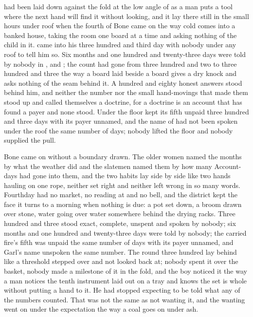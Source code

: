 
 had been laid down against the fold at the low angle of  as a man puts a tool where the next hand will find it without looking, and it lay there still in the small hours under  roof when the fourth of Bone came on the way cold comes into a banked house, taking the room one board at a time and asking nothing of the child in it.  came into his three hundred and third day with nobody under any roof to tell him so. Six months and one hundred and twenty-three days were told by nobody in ,  and ; the count had gone from three hundred and two to three hundred and three the way a board laid beside a board gives a dry knock and asks nothing of the seam behind it. A hundred and eighty honest answers stood behind him, and neither the number nor the small hand-movings that made them stood up and called themselves a doctrine, for a doctrine is an account that has found a payer and none stood. Under the floor  kept its fifth unpaid three hundred and three days with its payer unnamed, and the name of  had not been spoken under the roof the same number of days; nobody lifted the floor and nobody supplied the pull.

Bone came on without a boundary drawn. The older women named the months by what the weather did and the slatemen named them by how many Account-days had gone into them, and the two habits lay side by side like two hands hauling on one rope, neither set right and neither left wrong in so many words. Fourthday had no market, no reading at  and no bell, and the district kept the face it turns to a morning when nothing is due: a pot set down, a broom drawn over stone, water going over water somewhere behind the drying racks. Three hundred and three stood exact, complete, unspent and spoken by nobody; six months and one hundred and twenty-three days were told by nobody; the carried fire's fifth was unpaid the same number of days with its payer unnamed, and Garl's name unspoken the same number. The round three hundred lay behind like a threshold stepped over and not looked back at; nobody spent it over the basket, nobody made a milestone of it in the fold, and the boy noticed it the way a man notices the tenth instrument laid out on a tray and knows the set is whole without putting a hand to it. He had stopped expecting to be told what any of the numbers counted. That was not the same as not wanting it, and the wanting went on under the expectation the way a coal goes on under ash.

